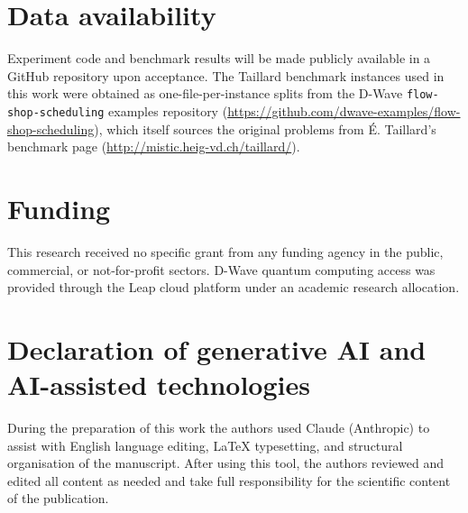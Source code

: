 \documentclass[preprint,12pt,authoryear]{elsarticle}
\begin{document}
\section*{Data availability}
Experiment code and benchmark results will be made publicly available
in a GitHub repository upon acceptance. The Taillard benchmark
instances used in this work were obtained as one-file-per-instance
splits from the D-Wave \texttt{flow-shop-scheduling} examples
repository (\url{https://github.com/dwave-examples/flow-shop-scheduling}),
which itself sources the original problems from \'E. Taillard's
benchmark page (\url{http://mistic.heig-vd.ch/taillard/}).

\section*{Funding}
This research received no specific grant from any funding agency in
the public, commercial, or not-for-profit sectors.
D-Wave quantum computing access was provided through the Leap cloud
platform under an academic research allocation.

\section*{Declaration of generative AI and AI-assisted technologies}
During the preparation of this work the authors used Claude
(Anthropic) to assist with English language editing, LaTeX typesetting,
and structural organisation of the manuscript.
After using this tool, the authors reviewed and edited all content as
needed and take full responsibility for the scientific content of the
publication.
\end{document}
